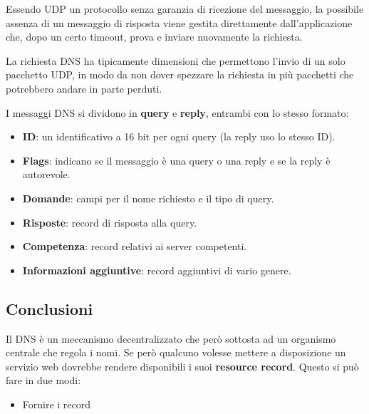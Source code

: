 Essendo UDP un protocollo senza garanzia di ricezione del messaggio, la possibile assenza di un
messaggio di risposta viene gestita direttamente dall'applicazione che, dopo un certo timeout, 
prova e inviare nuovamente la richiesta.

La richiesta DNS ha tipicamente dimensioni che permettono l'invio di un solo pacchetto UDP, in
modo da non dover spezzare la richiesta in più pacchetti che potrebbero andare in parte perduti.

I messaggi DNS si dividono in \textbf{query} e \textbf{reply}, entrambi con lo stesso formato:
\begin{itemize}
	\item \textbf{ID}: un identificativo a 16 bit per ogni query (la reply uso lo stesso ID).
	\item \textbf{Flags}: indicano se il messaggio è una query o una reply e se la reply è
		autorevole.
	\item \textbf{Domande}: campi per il nome richiesto e il tipo di query.
	\item \textbf{Risposte}: record di risposta alla query.
	\item \textbf{Competenza}: record relativi ai server competenti.
	\item \textbf{Informazioni aggiuntive}: record aggiuntivi di vario genere.
\end{itemize}

\subsection{Conclusioni}
Il DNS è un meccanismo decentralizzato che però sottosta ad un organismo centrale che regola i
nomi. Se però qualcuno volesse mettere a disposizione un servizio web dovrebbe rendere disponibili
i suoi \textbf{resource record}. Questo si può fare in due modi:
\begin{itemize}
	\item Fornire i record 
\end{itemize}
